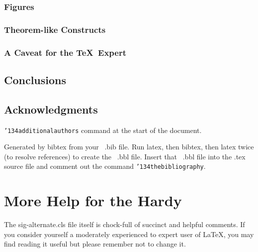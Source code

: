 \documentclass{sig-alternate-05-2015}
\begin{document}
\subsubsection{Figures}
\subsubsection{Theorem-like Constructs}
\subsubsection*{A Caveat for the \TeX\ Expert}
\subsection{Conclusions}
\subsection{Acknowledgments}
\texttt{{\char'134}additionalauthors} command at the start
of the document.

Generated by bibtex from your ~.bib file.  Run latex,
then bibtex, then latex twice (to resolve references)
to create the ~.bbl file.  Insert that ~.bbl file into
the .tex source file and comment out
the command \texttt{{\char'134}thebibliography}.
\section{More Help for the Hardy}
The sig-alternate.cls file itself is chock-full of succinct
and helpful comments.  If you consider yourself a moderately
experienced to expert user of \LaTeX, you may find reading
it useful but please remember not to change it.

\fi
%
%
%
\end{document}
